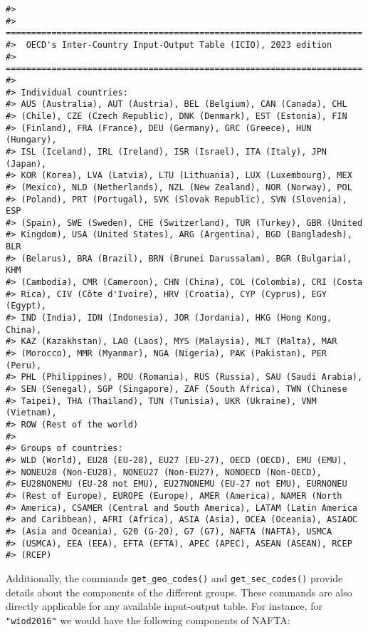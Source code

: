 \begin{verbatim}
#> 
#> ======================================================================
#>  OECD's Inter-Country Input-Output Table (ICIO), 2023 edition
#> ======================================================================
#> 
#> Individual countries:
#> AUS (Australia), AUT (Austria), BEL (Belgium), CAN (Canada), CHL
#> (Chile), CZE (Czech Republic), DNK (Denmark), EST (Estonia), FIN
#> (Finland), FRA (France), DEU (Germany), GRC (Greece), HUN (Hungary),
#> ISL (Iceland), IRL (Ireland), ISR (Israel), ITA (Italy), JPN (Japan),
#> KOR (Korea), LVA (Latvia), LTU (Lithuania), LUX (Luxembourg), MEX
#> (Mexico), NLD (Netherlands), NZL (New Zealand), NOR (Norway), POL
#> (Poland), PRT (Portugal), SVK (Slovak Republic), SVN (Slovenia), ESP
#> (Spain), SWE (Sweden), CHE (Switzerland), TUR (Turkey), GBR (United
#> Kingdom), USA (United States), ARG (Argentina), BGD (Bangladesh), BLR
#> (Belarus), BRA (Brazil), BRN (Brunei Darussalam), BGR (Bulgaria), KHM
#> (Cambodia), CMR (Cameroon), CHN (China), COL (Colombia), CRI (Costa
#> Rica), CIV (Côte d'Ivoire), HRV (Croatia), CYP (Cyprus), EGY (Egypt),
#> IND (India), IDN (Indonesia), JOR (Jordania), HKG (Hong Kong, China),
#> KAZ (Kazakhstan), LAO (Laos), MYS (Malaysia), MLT (Malta), MAR
#> (Morocco), MMR (Myanmar), NGA (Nigeria), PAK (Pakistan), PER (Peru),
#> PHL (Philippines), ROU (Romania), RUS (Russia), SAU (Saudi Arabia),
#> SEN (Senegal), SGP (Singapore), ZAF (South Africa), TWN (Chinese
#> Taipei), THA (Thailand), TUN (Tunisia), UKR (Ukraine), VNM (Vietnam),
#> ROW (Rest of the world)
#> 
#> Groups of countries:
#> WLD (World), EU28 (EU-28), EU27 (EU-27), OECD (OECD), EMU (EMU),
#> NONEU28 (Non-EU28), NONEU27 (Non-EU27), NONOECD (Non-OECD),
#> EU28NONEMU (EU-28 not EMU), EU27NONEMU (EU-27 not EMU), EURNONEU
#> (Rest of Europe), EUROPE (Europe), AMER (America), NAMER (North
#> America), CSAMER (Central and South America), LATAM (Latin America
#> and Caribbean), AFRI (Africa), ASIA (Asia), OCEA (Oceania), ASIAOC
#> (Asia and Oceania), G20 (G-20), G7 (G7), NAFTA (NAFTA), USMCA
#> (USMCA), EEA (EEA), EFTA (EFTA), APEC (APEC), ASEAN (ASEAN), RCEP
#> (RCEP)
\end{verbatim}

Additionally, the commands \texttt{get\_geo\_codes()} and \texttt{get\_sec\_codes()}
provide details about the components of the different groups. These commands
are also directly applicable for any available input-output table. For
instance, for \texttt{"wiod2016"} we would have the following components of
NAFTA:


